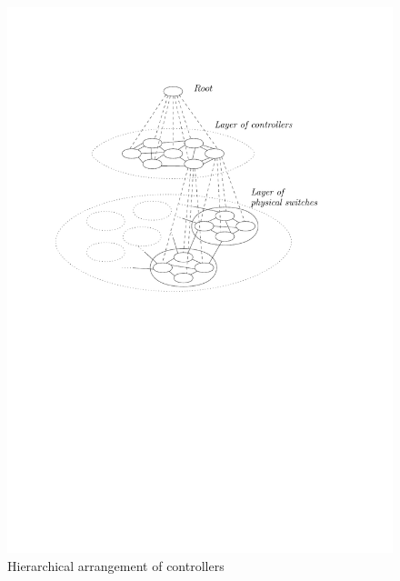 \documentclass[10pt, twocolumn]{article}
\begin{document}
\begin{figure}
\includegraphics[scale=0.5]{hierarchy}
\caption{Hierarchical arrangement of controllers}
\label{fig:hierarchy}
\end{figure}
\end{document}
